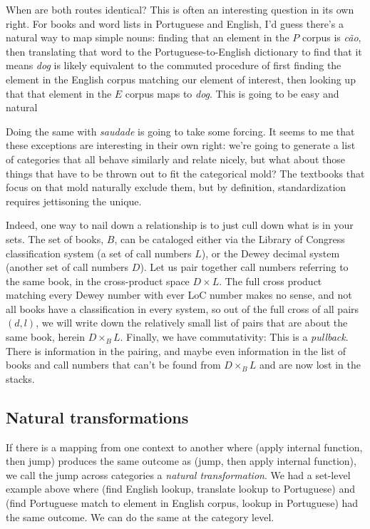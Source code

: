 \documentclass[11pt]{article}
\begin{document}
When are both routes identical? This is often an interesting question in its own right.
For books and word lists in Portuguese and English, I'd guess there's a natural
way to map simple nouns: finding that an element in the $P$ corpus is {\em cão},
then translating that word to the Portuguese-to-English dictionary to find that it means {\em dog}
is likely equivalent to the commuted procedure of first finding the element in the
English corpus matching our element of interest, then looking up that that element in
the $E$ corpus maps to {\em dog}. This is going to be easy and natural

Doing the same with {\em saudade} is going to take some forcing. It seems to me that
these exceptions are interesting in their own right: we're going to generate a list of
categories that all behave similarly and relate nicely, but what about those things
that have to be thrown out to fit the categorical mold? The textbooks that focus on
that mold naturally exclude them, but by definition, standardization requires jettisoning 
the unique.

Indeed, one way to nail down a relationship is to just cull down what is in your sets. The set
of books, $B$, can be cataloged either via the Library of Congress classification system
(a set of call numbers $L$), or the Dewey decimal system (another set of call numbers
$D$). Let us pair together call numbers referring to the same book, in the cross-product
space $D\times L$. The full cross product matching every Dewey number with ever LoC
number makes no sense, and not all books have a classification in every system,
so out of the full cross of all pairs $(d, l)$, we will write down the relatively
small list of pairs that are about the same book, herein $D\times_B L$.  Finally,
we have commutativity:
This is a {\em pullback}. There is information in the pairing, and maybe even
information in the list of books and call numbers that can't be found from $D\times_B L$
and are now lost in the stacks.

\subsection{Natural transformations}
If there is a mapping from one context to another where (apply internal function,
then jump) produces the same outcome as (jump, then apply internal function), we call
the jump across categories a {\em natural transformation}. We had a set-level example
above where (find English lookup, translate lookup to Portuguese) and (find Portuguese
match to element in English corpus, lookup in Portuguese) had the same outcome. We can do
the same at the category level.
\end{document}
